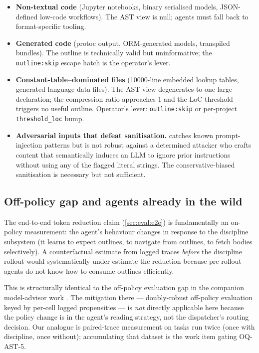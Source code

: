 \begin{itemize}[leftmargin=*]
  \item \textbf{Non-textual code} (Jupyter notebooks, binary
        serialised models, JSON-defined low-code workflows). The
        AST view is null; agents must fall back to format-specific
        tooling.
  \item \textbf{Generated code} (protoc output, ORM-generated
        models, transpiled bundles). The outline is technically
        valid but uninformative; the \texttt{outline:skip} escape
        hatch is the operator's lever.
  \item \textbf{Constant-table--dominated files} (10000-line
        embedded lookup tables, generated language-data files). The
        AST view degenerates to one large declaration; the
        compression ratio approaches 1 and the LoC threshold
        triggers no useful outline. Operator's lever:
        \texttt{outline:skip} or per-project
        \texttt{threshold\_loc} bump.
  \item \textbf{Adversarial inputs that defeat sanitisation.}
         catches known
        prompt-injection patterns but is not robust against a
        determined attacker who crafts content that semantically
        induces an LLM to ignore prior instructions without using
        any of the flagged literal strings. The conservative-biased
        sanitisation is necessary but not sufficient.
\end{itemize}

\subsection{Off-policy gap and agents already in the wild}
\label{sec:discussion:offpolicy}

The end-to-end token reduction claim (\cref{sec:eval:e2e}) is
fundamentally an on-policy measurement: the agent's behaviour
changes in response to the discipline subsystem (it learns to
expect outlines, to navigate from outlines, to fetch bodies
selectively). A counterfactual estimate from logged traces
\emph{before} the discipline rollout would systematically
under-estimate the reduction because pre-rollout agents do not know
how to consume outlines efficiently.

This is structurally identical to the off-policy evaluation gap in
the companion model-advisor work \cite{blackrim_moa_paper}. The
mitigation there --- doubly-robust off-policy evaluation
\cite{dudik2014doubly} keyed by per-cell logged propensities --- is
\emph{not} directly applicable here because the policy change is in
the agent's reading strategy, not the dispatcher's routing decision.
Our analogue is paired-trace measurement on tasks run twice (once
with discipline, once without); accumulating that dataset is the
work item gating OQ-AST-5.


